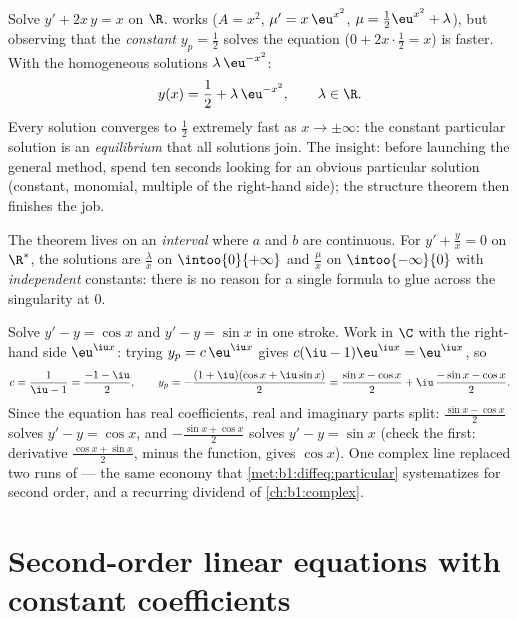 \begin{example}\label{ex:b1:diffeq:guess}
Solve $y' + 2x\,y = x$ on $\R$.  works ($A =
x^2$, $\mu' = x\,\eu^{x^2}$, $\mu = \frac12\eu^{x^2} + \lambda$),
but observing that the \emph{constant} $y_p = \frac12$ solves the
equation ($0 + 2x\cdot\frac12 = x$) is faster. With the
homogeneous solutions $\lambda\,\eu^{-x^2}$:
\[
y(x) = \frac12 + \lambda\,\eu^{-x^2}, \qquad \lambda \in \R .
\]
Every solution converges to $\frac12$ extremely fast as $x \to
\pm\infty$: the constant particular solution is an
\emph{equilibrium} that all solutions join. The insight: before
launching the general method, spend ten seconds looking for an
obvious particular solution (constant, monomial, multiple of the
right-hand side); the structure theorem then finishes the job.
\end{example}

\begin{remark}
The theorem lives on an \emph{interval} where $a$ and $b$ are
continuous. For $y' + \frac yx = 0$ on $\R^*$, the solutions are
$\frac{\lambda}{x}$ on $\intoo{0}{+\infty}$ and
$\frac{\mu}{x}$ on $\intoo{-\infty}{0}$ with \emph{independent}
constants: there is no reason for a single formula to glue across the
singularity at $0$.
\end{remark}

\begin{example}\label{ex:b1:diffeq:complexrhs}
Solve $y' - y = \cos x$ and $y' - y = \sin x$ in one stroke. Work
in $\C$ with the right-hand side $\eu^{\iu x}$: trying $y_p =
c\,\eu^{\iu x}$ gives $c(\iu - 1)\eu^{\iu x} = \eu^{\iu x}$, so
\[
c = \frac1{\iu - 1} = \frac{-1 - \iu}2,
\qquad
y_p = -\frac{(1 + \iu)(\cos x + \iu\sin x)}2
= \frac{\sin x - \cos x}2 + \iu\,\frac{-\sin x - \cos x}2 .
\]
Since the equation has real coefficients, real and imaginary
parts split: $\frac{\sin x - \cos x}2$ solves $y' - y = \cos x$,
and $-\frac{\sin x + \cos x}2$ solves $y' - y = \sin x$ (check
the first: derivative $\frac{\cos x + \sin x}2$, minus the
function, gives $\cos x$). One complex line replaced two runs of
 --- the same economy that
\cref{met:b1:diffeq:particular} systematizes for second order,
and a recurring dividend of \cref{ch:b1:complex}.
\end{example}

\section{Second-order linear equations with constant coefficients}

